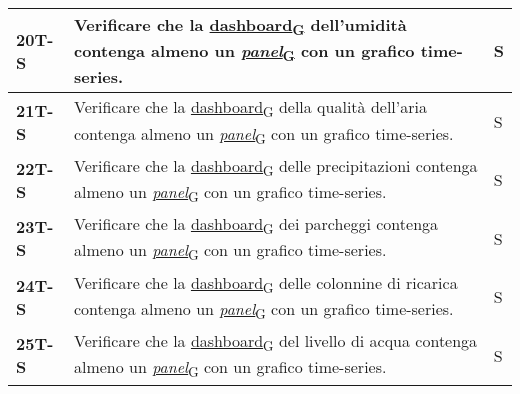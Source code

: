 \begin{longtable}{|>{\raggedright\arraybackslash}m{}|>{\raggedright\arraybackslash}m{}|>{\raggedright\arraybackslash}m{}|}
	\hline
	\textbf{20T-S}  & Verificare che la \href{https://7last.github.io/docs/pb/documentazione-interna/glossario\#dashboard}{dashboard\textsubscript{G}} dell'umidità contenga almeno un \href{https://7last.github.io/docs/pb/documentazione-interna/glossario\#panel}{\textit{panel}\textsubscript{G}} con un grafico time-series.                                                                                             & S              \\
	\hline
	\textbf{21T-S}  & Verificare che la \href{https://7last.github.io/docs/pb/documentazione-interna/glossario\#dashboard}{dashboard\textsubscript{G}} della qualità dell'aria contenga almeno un \href{https://7last.github.io/docs/pb/documentazione-interna/glossario\#panel}{\textit{panel}\textsubscript{G}} con un grafico time-series.                                                                                  & S              \\
	\hline
	\textbf{22T-S}  & Verificare che la \href{https://7last.github.io/docs/pb/documentazione-interna/glossario\#dashboard}{dashboard\textsubscript{G}} delle precipitazioni contenga almeno un \href{https://7last.github.io/docs/pb/documentazione-interna/glossario\#panel}{\textit{panel}\textsubscript{G}} con un grafico time-series.                                                                                     & S              \\
	\hline
	\textbf{23T-S}  & Verificare che la \href{https://7last.github.io/docs/pb/documentazione-interna/glossario\#dashboard}{dashboard\textsubscript{G}} dei parcheggi contenga almeno un \href{https://7last.github.io/docs/pb/documentazione-interna/glossario\#panel}{\textit{panel}\textsubscript{G}} con un grafico time-series.                                                                                            & S              \\
	\hline
	\textbf{24T-S}  & Verificare che la \href{https://7last.github.io/docs/pb/documentazione-interna/glossario\#dashboard}{dashboard\textsubscript{G}} delle colonnine di ricarica contenga almeno un \href{https://7last.github.io/docs/pb/documentazione-interna/glossario\#panel}{\textit{panel}\textsubscript{G}} con un grafico time-series.                                                                              & S              \\
	\hline
	\textbf{25T-S}  & Verificare che la \href{https://7last.github.io/docs/pb/documentazione-interna/glossario\#dashboard}{dashboard\textsubscript{G}} del livello di acqua contenga almeno un \href{https://7last.github.io/docs/pb/documentazione-interna/glossario\#panel}{\textit{panel}\textsubscript{G}} con un grafico time-series.                                                                                     & S              \\

\end{longtable}
